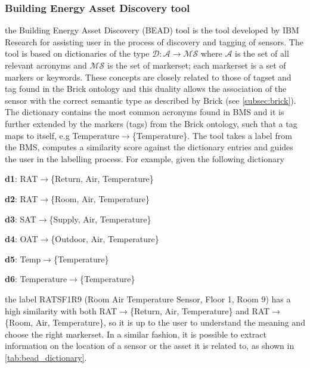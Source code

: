 \subsubsection{Building Energy Asset Discovery tool}
the Building Energy Asset Discovery (BEAD) tool\cite{bead} is the tool developed by IBM Research for assisting user in the process of discovery and tagging of sensors. The tool is based on dictionaries of the type $\mathcal{D}:\mathcal{A}\rightarrow \mathcal{MS}$ where $\mathcal{A}$ is the set of all relevant acronyms and $\mathcal{MS}$ is the set of markerset; each markerset is a set of markers or keywords. These concepts are closely related to those of tagset and tag found in the Brick ontology and this duality allows the association of the sensor with the correct semantic type as described by Brick (see \autoref{subsec:brick}). The dictionary contains the most common acronyms found in BMS and it is further extended by the markers (tags) from the Brick ontology, such that a tag maps to itself, e.g Temperature$\rightarrow$\{Temperature\}. The tool takes a label from the BMS, computes a similarity score against the dictionary entries and guides the user in the labelling process. For example, given the following dictionary
\begin{description}[noitemsep]
  \item \textbf{d1}: RAT$\rightarrow$\{Return, Air, Temperature\}
  \item \textbf{d2}: RAT$\rightarrow$\{Room, Air, Temperature\}
  \item \textbf{d3}: SAT$\rightarrow$\{Supply, Air, Temperature\}
  \item \textbf{d4}: OAT$\rightarrow$\{Outdoor, Air, Temperature\}
  \item \textbf{d5}: Temp$\rightarrow$\{Temperature\}
  \item \textbf{d6}: Temperature$\rightarrow$\{Temperature\}
\end{description}
the label RATSF1R9 (Room Air Temperature Sensor, Floor 1, Room 9) has a high similarity with both RAT$\rightarrow$\{Return, Air, Temperature\} and RAT$\rightarrow$\{Room, Air, Temperature\}, so it is up to the user to understand the meaning and choose the right markerset. In a similar fashion, it is possible to extract information on the location of a sensor or the asset it is related to, as shown in \autoref{tab:bead_dictionary}.
